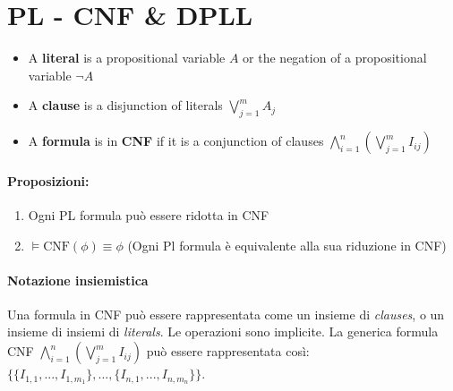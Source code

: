 \chapter{PL - CNF \& DPLL}
\begin{fdefinition}
\begin{itemize}
\item A \textbf{literal} is a propositional variable $A$ or the negation of a propositional variable $\lnot A$
\item A \textbf{clause} is a disjunction of literals $\bigvee\limits_{j=1}^m A_j$
\item A \textbf{formula} is in \textbf{CNF} if it is a conjunction of clauses $\bigwedge\limits_{i=1}^n (\bigvee\limits_{j=1}^m I_{ij})$
\end{itemize}
\end{fdefinition}

\subsubsection{Proposizioni:}
\begin{enumerate}
\item Ogni PL formula può essere ridotta in CNF
\item $\models \mathrm{CNF}(\phi) \equiv \phi$ (Ogni Pl formula è equivalente alla sua riduzione in CNF)
\end{enumerate}

\subsubsection{Notazione insiemistica}
Una formula in CNF può essere rappresentata come un insieme di \textit{clauses}, o un insieme di insiemi di \textit{literals}. Le operazioni sono implicite. La generica formula CNF $\bigwedge\limits_{i=1}^n (\bigvee\limits_{j=1}^m I_{ij})$ può essere rappresentata così: $\lbrace \lbrace I_{1,1}, ..., I_{1,m_1}\rbrace, ..., \lbrace I_{n, 1}, ..., I_{n, m_n} \rbrace \rbrace$.

